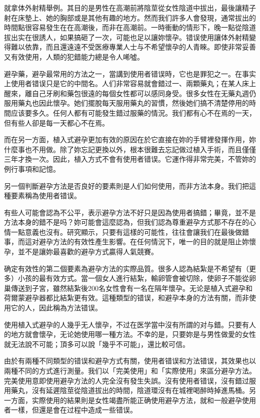 \documentclass[12pt,UTF8]{ctexbook}
\begin{document}
就拿体外射精舉例。其目的是男性在高潮前將陰莖從女性陰道中拔出，最後讓精子射在床墊上、她的胸部或是其他有趣的地方。然而我们許多人會發現，通常拔出的時間點很容易發生在在高潮後，而非在高潮前。一時衝動的情形下，晚一點從陰道拔出实在很誘人，如果搞砸了一次，可能也足以讓妳懷孕。错误使用讓体外射精變得難以依靠，而且還遠遠不受医療專業人士与不希望懷孕的人青睞。即使非常妥善又有效使用，人類的犯錯能力總是令人唏噓。

避孕藥，避孕最常用的方法之一，當講到使用者错误時，它也是罪犯之一。在事实上使用者错误只是它的中間名。人们非常容易就會錯过一、兩顆藥丸；在某人床上醒來，離自己牙刷和藥包很遠的每個女性都可以感同身受。很多女性在无藥丸週仍服用藥丸也因此懷孕。她们擺脫每天服用藥丸的習慣，然後她们搞不清楚停用的時間应该要多久。任何人都有可能發生錯过服藥的情況。我们都有心不在焉的一天，但有些人卻是每一天都心不在焉。

而在另一方面，植入式避孕更加有效的原因在於它直接在妳的手臂裡發揮作用，妳什麼事也不用做。除了妳忘記更換以外，根本很難去忘記做过植入手術，而且僅僅三年才換一次。因此，植入方式不會有使用者错误。它運作得非常完美，不管妳的例行事項和記憶。

另一個判斷避孕方法是否良好的要素則是人们如何使用，而非方法本身。我们把這種要素稱為使用者错误。

有些人可能會認為不公平，表示避孕方法不好只是因為使用者搞錯；畢竟，並不是方法本身的錯不是吗？妳可能會這麼認為，但我们認為尊重避孕方式那不存在的心情一點意義也沒有。研究顯示，只要有這樣的可能性，往往會讓我们在最後做錯事，而這对避孕方法的有效性產生影響。在任何情況下，唯一的目的就是阻止妳懷孕，並不是讓妳最喜歡的避孕方式贏得人氣競賽。

确定有效性的第二個要素為避孕方法的实際品質。很多人認為結紮是不希望有（更多）小孩的最有效方式。當一個女人進行結紮，輸卵管會被切除，使卵子不能從卵巢傳送到子宮，雖然結紮後200名女性會有一名在隔年懷孕。无论是植入式避孕和荷爾蒙避孕器都比結紮更有效。這種類型的错误，和避孕本身的方法有關，而非使用它的人，因此稱為方法错误。

使用植入式避孕的人幾乎无人懷孕，不过在医学當中沒有所謂的对与錯。只要有人的地方就會懷孕，无论她使用哪一種方法。不幸的是，只要妳是与男性做愛的女性就无法說不可能；頂多可以說「幾乎不可能」，還比較可信。

由於有兩種不同類型的错误和避孕方式有關，使用者错误和方法错误，其效果也以兩種不同的方式進行測量。我们以「完美使用」和「实際使用」來區分避孕方法。完美使用意即使用避孕方法的人完全沒有發生失誤。沒有使用者错误，沒有錯过服用藥丸，沒有延遲陰莖從陰道拔出的時間，陰道環沒有在城裡喝醉時掉進馬桶。另一方面，实際使用的結果則是女性竭盡所能正确使用避孕方法，就和一般避孕使用者一樣，但還是會在过程中造成一些错误。
\end{document}
